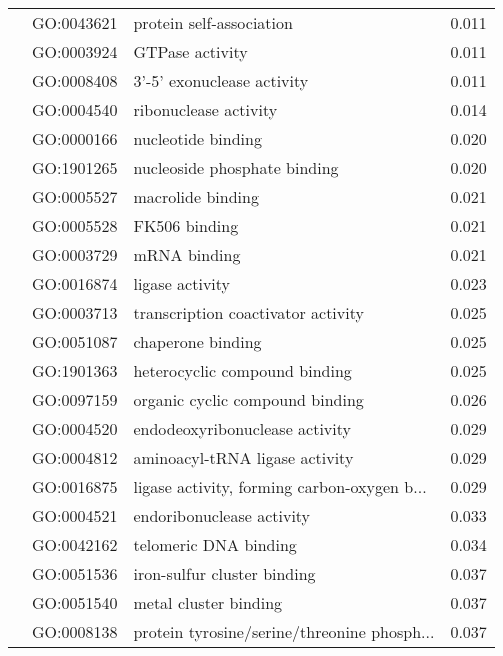 \begin{longtable}{lllr}
   & GO:0043621 &                     protein self-association &         0.011 \\
   & GO:0003924 &                              GTPase activity &         0.011 \\
   & GO:0008408 &                   3'-5' exonuclease activity &         0.011 \\
   & GO:0004540 &                        ribonuclease activity &         0.014 \\
   & GO:0000166 &                           nucleotide binding &         0.020 \\
   & GO:1901265 &                 nucleoside phosphate binding &         0.020 \\
   & GO:0005527 &                            macrolide binding &         0.021 \\
   & GO:0005528 &                                FK506 binding &         0.021 \\
   & GO:0003729 &                                 mRNA binding &         0.021 \\
   & GO:0016874 &                              ligase activity &         0.023 \\
   & GO:0003713 &           transcription coactivator activity &         0.025 \\
   & GO:0051087 &                            chaperone binding &         0.025 \\
   & GO:1901363 &                heterocyclic compound binding &         0.025 \\
   & GO:0097159 &              organic cyclic compound binding &         0.026 \\
   & GO:0004520 &               endodeoxyribonuclease activity &         0.029 \\
   & GO:0004812 &               aminoacyl-tRNA ligase activity &         0.029 \\
   & GO:0016875 &  ligase activity, forming carbon-oxygen b... &         0.029 \\
   & GO:0004521 &                    endoribonuclease activity &         0.033 \\
   & GO:0042162 &                        telomeric DNA binding &         0.034 \\
   & GO:0051536 &                  iron-sulfur cluster binding &         0.037 \\
   & GO:0051540 &                        metal cluster binding &         0.037 \\
   & GO:0008138 &  protein tyrosine/serine/threonine phosph... &         0.037 \\

\end{longtable}
